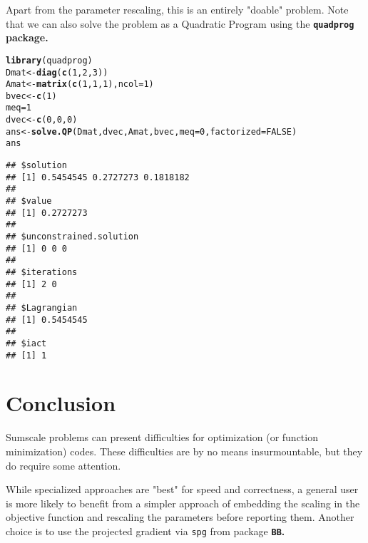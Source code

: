 \documentclass[11pt]{article}\usepackage[]{graphicx}\usepackage[]{color}
\makeatletter
\newcommand{\hlnum}[1]{\textcolor[rgb]{0.686,0.059,0.569}{#1}}%
\newcommand{\hlstd}[1]{\textcolor[rgb]{0.345,0.345,0.345}{#1}}%
\newcommand{\hlkwb}[1]{\textcolor[rgb]{0.69,0.353,0.396}{#1}}%
\newcommand{\hlkwc}[1]{\textcolor[rgb]{0.333,0.667,0.333}{#1}}%
\newcommand{\hlkwd}[1]{\textcolor[rgb]{0.737,0.353,0.396}{\textbf{#1}}}%
\newenvironment{kframe}{%
 \def\at@end@of@kframe{}%
 \ifinner\ifhmode%
  \def\at@end@of@kframe{\end{minipage}}%
  \begin{minipage}{\columnwidth}%
 \fi\fi%
 \def\FrameCommand##1{\hskip\@totalleftmargin \hskip-\fboxsep
 \colorbox{shadecolor}{##1}\hskip-\fboxsep
     \hskip-\linewidth \hskip-\@totalleftmargin \hskip\columnwidth}%
 \MakeFramed {\advance\hsize-\width
   \@totalleftmargin\z@ \linewidth\hsize
   \@setminipage}}%
 {\par\unskip\endMakeFramed%
 \at@end@of@kframe}
\newenvironment{knitrout}{}{} %
\newcommand{\code}[1]{{\tt#1}}
\newcommand{\pkg}[1]{\bf{\tt#1}\rm }
\makeatother
\begin{document}
Apart from the parameter rescaling, this is an entirely "doable" problem. 
Note that we can also solve the problem as a Quadratic Program using
the \pkg{quadprog} package.

\begin{knitrout}\scriptsize
{}\color{fgcolor}\begin{kframe}
\begin{alltt}
\hlkwd{library}\hlstd{(quadprog)}
\hlstd{Dmat}\hlkwb{<-}\hlkwd{diag}\hlstd{(}\hlkwd{c}\hlstd{(}\hlnum{1}\hlstd{,}\hlnum{2}\hlstd{,}\hlnum{3}\hlstd{))}
\hlstd{Amat}\hlkwb{<-}\hlkwd{matrix}\hlstd{(}\hlkwd{c}\hlstd{(}\hlnum{1}\hlstd{,} \hlnum{1}\hlstd{,} \hlnum{1}\hlstd{),} \hlkwc{ncol}\hlstd{=}\hlnum{1}\hlstd{)}
\hlstd{bvec}\hlkwb{<-}\hlkwd{c}\hlstd{(}\hlnum{1}\hlstd{)}
\hlstd{meq}\hlkwb{=}\hlnum{1}
\hlstd{dvec}\hlkwb{<-}\hlkwd{c}\hlstd{(}\hlnum{0}\hlstd{,} \hlnum{0}\hlstd{,} \hlnum{0}\hlstd{)}
\hlstd{ans}\hlkwb{<-}\hlkwd{solve.QP}\hlstd{(Dmat, dvec, Amat, bvec,} \hlkwc{meq}\hlstd{=}\hlnum{0}\hlstd{,} \hlkwc{factorized}\hlstd{=}\hlnum{FALSE}\hlstd{)}
\hlstd{ans}
\end{alltt}
\begin{verbatim}
## $solution
## [1] 0.5454545 0.2727273 0.1818182
## 
## $value
## [1] 0.2727273
## 
## $unconstrained.solution
## [1] 0 0 0
## 
## $iterations
## [1] 2 0
## 
## $Lagrangian
## [1] 0.5454545
## 
## $iact
## [1] 1
\end{verbatim}
\end{kframe}
\end{knitrout}



\section{Conclusion}

Sumscale problems can present difficulties for optimization (or function minimization)
codes. These difficulties are by no means insurmountable, but they do require some 
attention.

While specialized approaches are "best" for speed and correctness, a general user is more
likely to benefit from a simpler approach of embedding the scaling in the objective function
and rescaling the parameters before reporting them. Another choice is to use the projected
gradient via \code{spg} from package \pkg{BB}.




\end{document}
